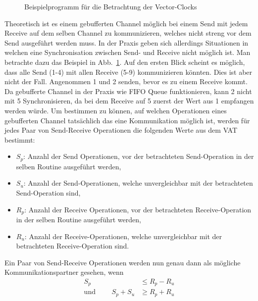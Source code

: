 \begin{figure}[h!]
  \centering
  
  \caption{Beispielprogramm für die Betrachtung der Vector-Clocks}
  \label{Chap:Analyze-Sec:Channel-SubSec:Dangling-Fig:BufferedNoSync}
\end{figure}
Theoretisch ist es einem gebufferten Channel möglich bei einem Send mit 
jedem Receive auf dem selben Channel zu kommunizieren, welches nicht 
streng vor dem Send ausgeführt werden muss. In der Praxis geben sich allerdings 
Situationen in welchen eine Synchronisation zwischen Send- und Receive nicht 
möglich ist. Man betrachte dazu das Beispiel in 
Abb.~\ref{Chap:Analyze-Sec:Channel-SubSec:Dangling-Fig:BufferedNoSync}.
Auf den ersten Blick scheint es möglich, dass alle Send (1-4) mit allen 
Receive (5-9) kommunizieren könnten. Dies ist aber nicht der Fall.
Angenommen 1 und 2 senden, bevor es zu einem Receive kommt. Da gebufferte 
Channel in der Praxis wie FIFO Queue funktionieren, kann 2 nicht mit 5 
Synchronisieren, da bei dem Receive auf 5 zuerst der Wert aus 1 empfangen 
werden würde. Um bestimmen zu können, auf welchen Operationen eines 
gebufferten Channel tatsächlich das eine Kommunikation möglich ist, 
werden für jedes Paar von Send-Receive Operationen die folgenden Werte aus 
dem VAT bestimmt: 
\begin{itemize}
  \item $S_p$: Anzahl der Send Operationen, vor der betrachteten Send-Operation 
    in der selben Routine ausgeführt werden,
  \item $S_u$: Anzahl der Send-Operationen, welche unvergleichbar mit der 
    betrachteten Send-Operation sind,
  \item $R_p$: Anzahl der Receive Operationen, vor der betrachteten Receive-Operation 
    in der selben Routine ausgeführt werden,
  \item $R_u$: Anzahl der Receive-Operationen, welche unvergleichbar mit der 
    betrachteten Receive-Operation sind.
\end{itemize}
Ein Paar von Send-Receive Operationen werden nun genau dann als mögliche 
Kommunikationspartner gesehen, wenn 
\begin{align}
  S_p &\leq R_p - R_u  \label{Form:1}\\
  \text{und }\qquad S_p +  S_u &\geq R_p + R_u \label{Form:2}
\end{align}

